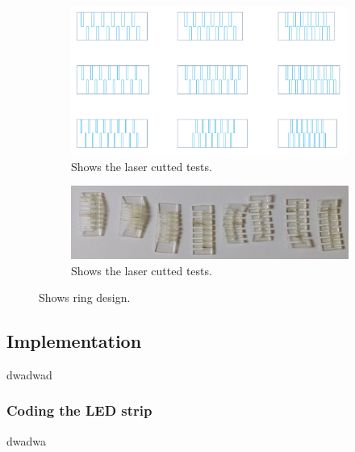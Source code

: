 \documentclass[doc.tex]{subfiles}
\begin{document}
        \begin{figure}[ht!]
            \centering
            \begin{subfigure}{.5\textwidth}
              \centering
              \includegraphics[width=.8\linewidth]{images/process/test_shapes.PNG}
              \caption{Shows the laser cutted tests.}
              \label{fig:test_shapes}
            \end{subfigure}%
            \begin{subfigure}{.5\textwidth}
              \centering
              \includegraphics[width=.8\linewidth]{images/process/laserCutTests.jpg}
              \caption{Shows the laser cutted tests.}
              \label{fig:ringdesign2}
            \end{subfigure}
            \caption{Shows ring design.}
            \label{fig:laserCutTests}
        \end{figure}

    \subsection{Implementation}
        \begin{flushleft}
        dwadwad
        \end{flushleft}

    \subsubsection{Coding the LED strip}
        \begin{flushleft}
        dwadwa
        \end{flushleft}
\end{document}
